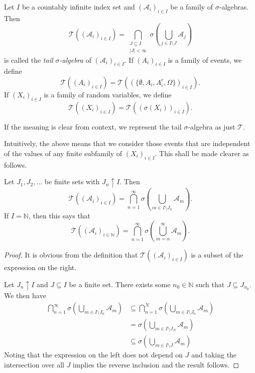 \begin{definition}
    Let $I$ be a countably infinite index set and $(\mathcal{A}_i)_{i\in I}$ be a family of $\sigma$-algebras. Then
    $$\mathcal{T}((\mathcal{A}_i)_{i\in I})=\bigcap_{\substack{J\subseteq I \\ |J|<\infty}} \sigma\left(\bigcup_{j\in I\setminus J}\mathcal{A}_j\right)$$
    is called the \textit{tail $\sigma$-algebra} of $(\mathcal{A}_i)_{i\in I}$. If $(A_i)_{i\in I}$ is a family of events, we define
    $$\mathcal{T}((A_i)_{i\in I}) = \mathcal{T}((\{\emptyset,A_i,A_i^c,\Omega\})_{i\in I}).$$
    If $(X_i)_{i\in I}$ is a family of random variables, we define
    $$\mathcal{T}((X_i)_{i\in I}) = \mathcal{T}((\sigma(X_i))_{i\in I}).$$
\end{definition}

If the meaning is clear from context, we represent the tail $\sigma$-algebra as just $\mathcal{T}$.

Intuitively, the above means that we consider those events that are independent of the values of any finite subfamily of $(X_i)_{i\in I}$. This shall be made clearer as follows.

\begin{theorem}
    Let $J_1,J_2,\ldots$ be finite sets with $J_n\uparrow I$. Then
    $$\mathcal{T}((\mathcal{A}_i)_{i\in I})=\bigcap_{n=1}^\infty \sigma\left(\bigcup_{m\in I\setminus J_n} \mathcal{A}_m\right).$$
    If $I=\mathbb{N}$, then this says that
    $$\mathcal{T}((\mathcal{A}_i)_{i\in\mathbb{N}}) = \bigcap_{n=1}^\infty \sigma\left(\bigcup_{m=n}^\infty \mathcal{A}_m\right).$$
\end{theorem}
\begin{proof}
    It is obvious from the definition that $\mathcal{T}((\mathcal{A}_i)_{i\in I})$ is a subset of the expression on the right.
    
    Let $J_n\uparrow I$ and $J\subseteq I$ be a finite set. There exists some $n_0\in\mathbb{N}$ such that $J\subseteq J_{n_0}$. We then have
    \begin{align*}
        \bigcap_{n=1}^\infty \sigma\left(\bigcup_{m\in I\setminus J_n} \mathcal{A}_m\right) &\subseteq \bigcap_{n=1}^N \sigma\left(\bigcup_{m\in I\setminus J_n} \mathcal{A}_m\right) \\
        &= \sigma\left(\bigcup_{m\in I\setminus J_N} \mathcal{A}_m\right) \\
        &\subseteq \sigma\left(\bigcup_{m\in I\setminus J} \mathcal{A}_m\right)
    \end{align*}
    Noting that the expression on the left does not depend on $J$ and taking the intersection over all $J$ implies the reverse inclusion and the result follows.
\end{proof}


